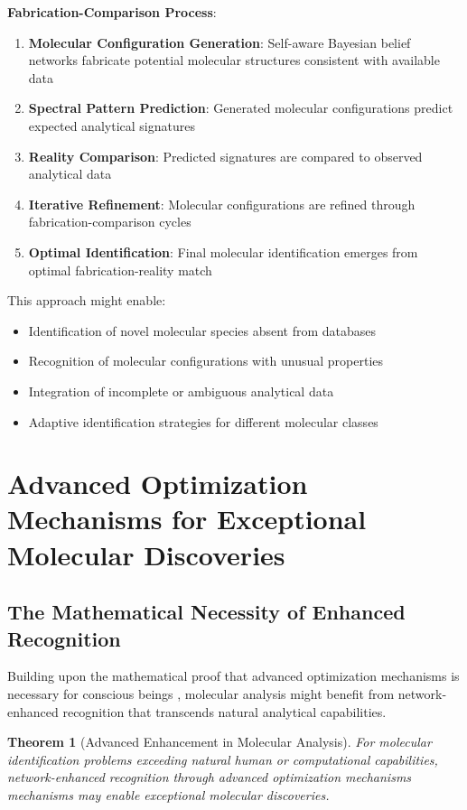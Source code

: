 \documentclass[11pt,a4paper]{article}
\newtheorem{theorem}{Theorem}[section]
\theoremstyle{remark}
\begin{document}
\textbf{Fabrication-Comparison Process}:
\begin{enumerate}
\item \textbf{Molecular Configuration Generation}: Self-aware Bayesian belief networks fabricate potential molecular structures consistent with available data
\item \textbf{Spectral Pattern Prediction}: Generated molecular configurations predict expected analytical signatures
\item \textbf{Reality Comparison}: Predicted signatures are compared to observed analytical data
\item \textbf{Iterative Refinement}: Molecular configurations are refined through fabrication-comparison cycles
\item \textbf{Optimal Identification}: Final molecular identification emerges from optimal fabrication-reality match
\end{enumerate}

This approach might enable:
\begin{itemize}
\item Identification of novel molecular species absent from databases
\item Recognition of molecular configurations with unusual properties
\item Integration of incomplete or ambiguous analytical data
\item Adaptive identification strategies for different molecular classes
\end{itemize}

\section{Advanced Optimization Mechanisms for Exceptional Molecular Discoveries}

\subsection{The Mathematical Necessity of Enhanced Recognition}

Building upon the mathematical proof that advanced optimization mechanisms is necessary for conscious beings \cite{sachikonye2024optimization}, molecular analysis might benefit from network-enhanced recognition that transcends natural analytical capabilities.

\begin{theorem}[Advanced Enhancement in Molecular Analysis]
For molecular identification problems exceeding natural human or computational capabilities, network-enhanced recognition through advanced optimization mechanisms mechanisms may enable exceptional molecular discoveries.
\end{theorem}
\end{document}
